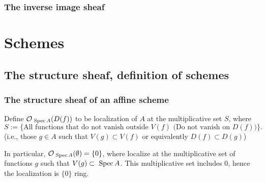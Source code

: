 \documentclass[11pt,fleqn]{book} %
\begin{document}
\section{The inverse image sheaf}















\part{Schemes}




\chapter{The structure sheaf, definition of schemes}
\section{The structure sheaf of an affine scheme
}
\begin{definition}
Define ${\cal O}_{\text{ Spec\,} A}(D(f))$ to be localization of $A$ at the multiplicative set $S$, where
$$
S:=\{\text{All functions that do not vanish outside $V(f)$ (Do not vanish on $D(f))$}\}.
$$
(i.e., those $g\in A$ such that $V(g)\subset V(f)$ or equivalently $D(f)\subset D(g)$)
\end{definition}
In particular, ${\cal O}_{\text{ Spec\,} A}(\emptyset)=\{0\}$, where localize at the multiplicative set of functions $g$ such that $V(g)\subset \text{ Spec\,} A$. This multiplicative set includes $0$, hence the localization is $\{0\}$ ring.
\end{document}
